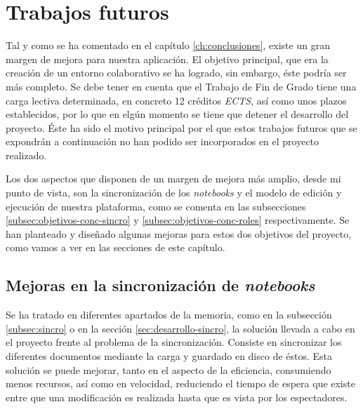 \documentclass[11pt,spanish,listoffigures,listoftables]{tfgetsinf}
\begin{document}



\chapter{Trabajos futuros}
\label{ch:futuro}


Tal y como se ha comentado en el capítulo \ref{ch:conclusiones}, existe un gran margen de mejora para nuestra aplicación. El objetivo principal, que era la creación de un entorno colaborativo se ha logrado, sin embargo, éste podría ser más completo. Se debe tener en cuenta que el Trabajo de Fin de Grado tiene una carga lectiva determinada, en concreto 12 créditos \textit{ECTS}, así como unos plazos establecidos, por lo que en elgún momento se tiene que detener el desarrollo del proyecto. Éste ha sido el motivo principal por el que estos trabajos futuros que se expondrán a continuación no han podido ser incorporados en el proyecto realizado.

Los dos aspectos que disponen de un margen de mejora más amplio, desde mi punto de vista, son la sincronización de los \textit{notebooks} y el modelo de edición y ejecución de nuestra plataforma, como se comenta en las subsecciones \ref{subsec:objetivos-conc-sincro} y \ref{subsec:objetivos-conc-roles} respectivamente. Se han planteado y diseñado algunas mejoras para estos dos objetivos del proyecto, como vamos a ver en las secciones de este capítulo.



\section{Mejoras en la sincronización de \textit{notebooks}}
\label{sec:mejoras-sincro}

Se ha tratado en diferentes apartados de la memoria, como en la subsección \ref{subsec:sincro} o en la sección \ref{sec:desarrollo-sincro}, la solución llevada a cabo en el proyecto frente al problema de la sincronización. Consiste en sincronizar los diferentes documentos mediante la carga y guardado en disco de éstos. 
Esta solución se puede mejorar, tanto en el aspecto de la eficiencia, consumiendo menos recursos, así como en velocidad, reduciendo el tiempo de espera que existe entre que una modificación es realizada hasta que es vista por los espectadores.
\end{document}
